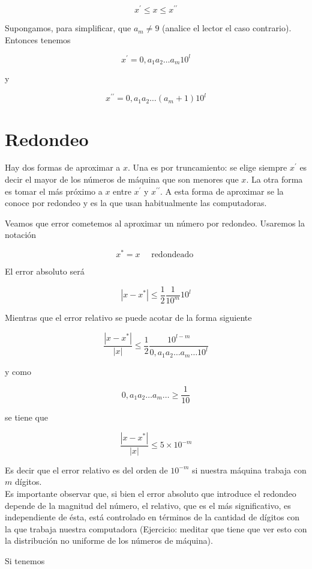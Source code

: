 \documentclass[10pt]{book}
\begin{document}
$$
x^{\prime} \leq x \leq x^{\prime \prime}
$$

Supongamos, para simplificar, que $a_{m} \neq 9$ (analice el lector el caso contrario). Entonces tenemos

$$
x^{\prime}=0, a_{1} a_{2} \ldots a_{m} 10^{l}
$$

y

$$
x^{\prime \prime}=0, a_{1} a_{2} \ldots\left(a_{m}+1\right) 10^{l}
$$

\section{Redondeo}
Hay dos formas de aproximar a $x$. Una es por truncamiento: se elige siempre $x^{\prime}$ es decir el mayor de los números de máquina que son menores que $x$. La otra forma es tomar el más próximo a $x$ entre $x^{\prime}$ y $x^{\prime \prime}$. A esta forma de aproximar se la conoce por redondeo y es la que usan habitualmente las computadoras.

Veamos que error cometemos al aproximar un número por redondeo. Usaremos la notación

$$
x^{*}=x \quad \text { redondeado }
$$

El error absoluto será

$$
\left|x-x^{*}\right| \leq \frac{1}{2} \frac{1}{10^{m}} 10^{l}
$$

Mientras que el error relativo se puede acotar de la forma siguiente

$$
\frac{\left|x-x^{*}\right|}{|x|} \leq \frac{1}{2} \frac{10^{l-m}}{0, a_{1} a_{2} \ldots a_{m} \ldots 10^{l}}
$$

y como

$$
0, a_{1} a_{2} \ldots a_{m} \ldots \geq \frac{1}{10}
$$

se tiene que

$$
\frac{\left|x-x^{*}\right|}{|x|} \leq 5 \times 10^{-m}
$$

Es decir que el error relativo es del orden de $10^{-m}$ si nuestra máquina trabaja con $m$ dígitos.\\
Es importante observar que, si bien el error absoluto que introduce el redondeo depende de la magnitud del número, el relativo, que es el más significativo, es independiente de ésta, está controlado en términos de la cantidad de dígitos con la que trabaja nuestra computadora (Ejercicio: meditar que tiene que ver esto con la distribución no uniforme de los números de máquina).

Si tenemos
\end{document}
